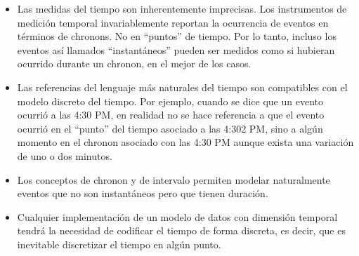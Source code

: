 \begin{itemize}
    \item Las medidas del tiempo son inherentemente imprecisas. Los instrumentos de medición temporal invariablemente reportan la ocurrencia de eventos en términos de chronons. No en “puntos” de tiempo. Por lo tanto, incluso los eventos así llamados “instantáneos” pueden ser medidos como si hubieran ocurrido durante un chronon, en el mejor de los casos.
    \item Las referencias del lenguaje más naturales del tiempo son compatibles con el modelo discreto del tiempo. Por ejemplo, cuando se dice que un evento ocurrió a las 4:30 PM, en realidad no se hace referencia a que el evento ocurrió en el “punto” del tiempo asociado a las 4:302 PM, sino a algún momento en el chronon asociado con las 4:30 PM aunque exista una variación de uno o dos minutos.
    \item Los conceptos de chronon y de intervalo permiten modelar naturalmente eventos que no son instantáneos pero que tienen duración.
    \item Cualquier implementación de un modelo de datos con dimensión temporal tendrá la necesidad de codificar el tiempo de forma discreta, es decir, que es inevitable discretizar el tiempo en algún punto.
    
\end{itemize}